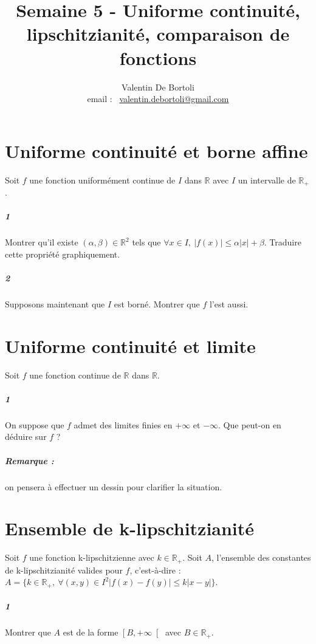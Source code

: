 \documentclass[10pt,a4paper]{article}
\title{Semaine 5 - Uniforme continuité, lipschitzianité, comparaison de fonctions}
\author{Valentin De Bortoli \\ email : \ \href{mailto:valentin.debortoli@gmail.com}{valentin.debortoli@gmail.com}}
\date{}
\begin{document}
\maketitle

\section{Uniforme continuité et borne affine}
Soit $f$ une fonction uniformément continue de $I$ dans $\mathbb{R}$ avec $I$ un intervalle de $\mathbb{R}_{+}$.
\subparagraph{1}Montrer qu'il existe $(\alpha,\beta) \in \mathbb{R}^2$ tels que $\forall x \in I, \  \vert f(x) \vert \le \alpha \vert x \vert + \beta$. Traduire cette propriété graphiquement.
\subparagraph{2}Supposons maintenant que $I$ est borné. Montrer que $f$ l'est aussi.

\section{Uniforme continuité et limite}
Soit $f$ une fonction continue de $\mathbb{R}$ dans $\mathbb{R}$.
\subparagraph{1}On suppose que $f$ admet des limites finies en $+\infty$ et $-\infty$. Que peut-on en déduire sur $f$ ?
\subparagraph{Remarque :} on pensera à effectuer un dessin pour clarifier la situation.

\section{Ensemble de k-lipschitzianité}
Soit $f$ une fonction k-lipschitzienne avec $k \in \mathbb{R}_{+}$. Soit $A$, l'ensemble des constantes de k-lipschitzianité valides pour $f$, c'est-à-dire : $A=\{ k \in \mathbb{R}_{+}, \ \forall(x,y) \in I^2 \vert f(x)-f(y) \vert \le k \vert x-y \vert \}$.
\subparagraph{1}Montrer que $A$ est de la forme $\left[B,+\infty\right[$ avec $B \in \mathbb{R}_+$.
\end{document}
